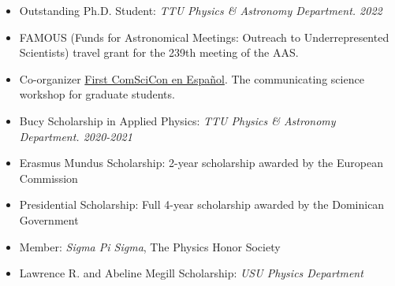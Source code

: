 \documentclass[letterpaper,10pt]{article}
\begin{document}
\begin{itemize}[label=$\blacktriangleright$]


\item Outstanding Ph.D. Student: \emph{TTU Physics \& Astronomy Department. 2022} %

\item FAMOUS (Funds for Astronomical Meetings: Outreach to Underrepresented Scientists) travel grant for the 239th meeting of the AAS.

\item Co-organizer \href{https://comscicon.com/comscicon-en-espanol-2021}{First ComSciCon en Espa\~nol}. The communicating science workshop for graduate students.




\item Bucy Scholarship in Applied Physics: \emph{TTU Physics \& Astronomy Department. 2020-2021} %





  \item Erasmus Mundus Scholarship: 2-year scholarship awarded by the European Commission %
\item Presidential Scholarship: Full 4-year scholarship awarded by the Dominican Government %


\item  Member: \emph{Sigma Pi Sigma}, The Physics Honor Society %


\item Lawrence  R. and Abeline Megill Scholarship: \emph{USU Physics Department}   %
  \end{itemize}
\end{document}
